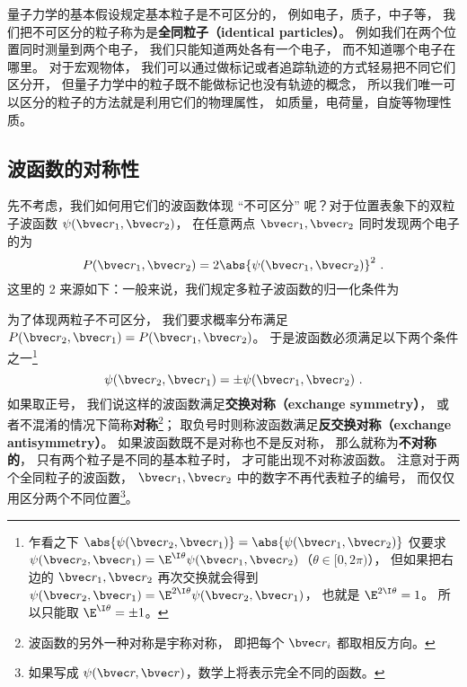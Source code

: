 

量子力学的基本假设规定基本粒子是不可区分的， 例如电子，质子，中子等， 我们把不可区分的粒子称为是\textbf{全同粒子（identical particles）}。 例如我们在两个位置同时测量到两个电子， 我们只能知道两处各有一个电子， 而不知道哪个电子在哪里。 对于宏观物体， 我们可以通过做标记或者追踪轨迹的方式轻易把不同它们区分开， 但量子力学中的粒子既不能做标记也没有轨迹的概念， 所以我们唯一可以区分的粒子的方法就是利用它们的物理属性， 如质量，电荷量，自旋等物理性质。

\subsection{波函数的对称性}
先不考虑，我们如何用它们的波函数体现 “不可区分” 呢？对于位置表象下的双粒子波函数 $\psi(\bvec r_1, \bvec r_2)$， 在任意两点 $\bvec r_1, \bvec r_2$ 同时发现两个电子的为
\begin{equation}
P(\bvec r_1, \bvec r_2) = 2\abs{\psi(\bvec r_1, \bvec r_2)}^2~.
\end{equation}
这里的 2 来源如下：一般来说，我们规定多粒子波函数的归一化条件为



为了体现两粒子不可区分， 我们要求概率分布满足 $P(\bvec r_2, \bvec r_1) = P(\bvec r_1, \bvec r_2)$。 于是波函数必须满足以下两个条件之一\footnote{乍看之下 $\abs{\psi(\bvec r_2, \bvec r_1)} = \abs{\psi(\bvec r_1, \bvec r_2)}$ 仅要求 $\psi(\bvec r_2, \bvec r_1) = \E^{\I \theta} \psi(\bvec r_1, \bvec r_2)$（$\theta \in [0, 2\pi)$）， 但如果把右边的 $\bvec r_1, \bvec r_2$ 再次交换就会得到 $\psi(\bvec r_2, \bvec r_1) = \E^{2\I \theta} \psi(\bvec r_2, \bvec r_1)$， 也就是 $\E^{2\I \theta} = 1$。 所以只能取 $\E^{\I\theta} = \pm 1$。}
\begin{equation}\label{eq_IdPar_5}
\psi(\bvec r_2, \bvec r_1) = \pm \psi(\bvec r_1, \bvec r_2)~.
\end{equation}
如果取正号， 我们说这样的波函数满足\textbf{交换对称（exchange symmetry）}， 或者不混淆的情况下简称\textbf{对称}\footnote{波函数的另外一种对称是宇称对称，%
即把每个 $\bvec r_i$ 都取相反方向。}； 取负号时则称波函数满足\textbf{反交换对称（exchange antisymmetry）}。 如果波函数既不是对称也不是反对称， 那么就称为\textbf{不对称的}， 只有两个粒子是不同的基本粒子时， 才可能出现不对称波函数。 注意对于两个全同粒子的波函数， $\bvec r_1, \bvec r_2$ 中的数字不再代表粒子的编号， 而仅仅用区分两个不同位置\footnote{如果写成 $\psi(\bvec r, \bvec r)$，数学上将表示完全不同的函数。}。

